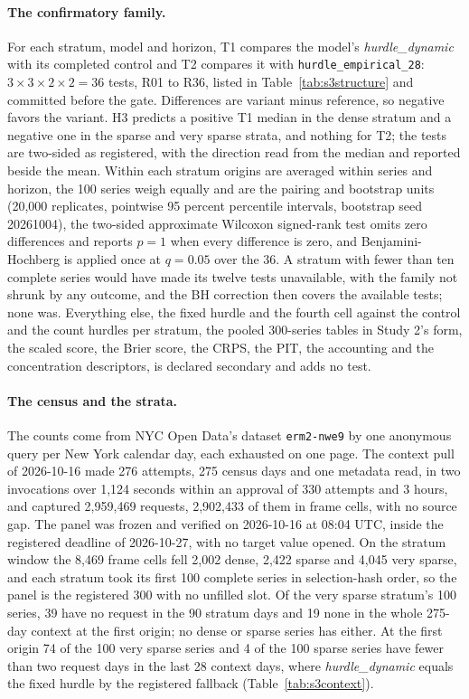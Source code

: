 \paragraph{The confirmatory family.} For each stratum, model and horizon, T1 compares the model's
\emph{hurdle\_dynamic} with its completed control and T2 compares it with \texttt{hurdle\_empirical\_28}:
$3 \times 3 \times 2 \times 2 = 36$ \qs{} tests, R01 to R36, listed in Table~\ref{tab:s3structure} and
committed before the gate. Differences are variant minus reference, so negative favors the variant. H3
predicts a positive T1 median in the dense stratum and a negative one in the sparse and very sparse strata,
and nothing for T2; the tests are two-sided as registered, with the direction read from the median and
reported beside the mean. Within each stratum origins are averaged within series and horizon, the 100 series
weigh equally and are the pairing and bootstrap units (20,000 replicates, pointwise 95 percent percentile
intervals, bootstrap seed 20261004), the two-sided approximate Wilcoxon signed-rank test omits zero
differences and reports $p = 1$ when every difference is zero, and Benjamini-Hochberg is applied once at
$q = 0.05$ over the 36. A stratum with fewer than ten complete series would have made its twelve tests
unavailable, with the family not shrunk by any outcome, and the BH correction then covers the available
tests; none was. Everything else, the fixed hurdle and the fourth cell against the control and the count
hurdles per stratum, the pooled 300-series tables in Study 2's form, the scaled score, the Brier score, the
CRPS, the PIT, the accounting and the concentration descriptors, is declared secondary and adds no test.

\paragraph{The census and the strata.} The counts come from NYC Open Data's dataset \texttt{erm2-nwe9} by
one anonymous query per New York calendar day, each exhausted on one page. The context pull of 2026-10-16
made 276 attempts, 275 census days and one metadata read, in two invocations over 1,124 seconds within an
approval of 330 attempts and 3 hours, and captured 2,959,469 requests, 2,902,433 of them in frame cells,
with no source gap. The panel was frozen and verified on 2026-10-16 at 08:04 UTC, inside the registered
deadline of 2026-10-27, with no target value opened. On the stratum window the 8,469 frame cells fell 2,002
dense, 2,422 sparse and 4,045 very sparse, and each stratum took its first 100 complete series in
selection-hash order, so the panel is the registered 300 with no unfilled slot. Of the very sparse stratum's
100 series, 39 have no request in the 90 stratum days and 19 none in the whole 275-day context at the first
origin; no dense or sparse series has either. At the first origin 74 of the 100 very sparse series and 4 of
the 100 sparse series have fewer than two request days in the last 28 context days, where
\emph{hurdle\_dynamic} equals the fixed hurdle by the registered fallback (Table~\ref{tab:s3context}).

